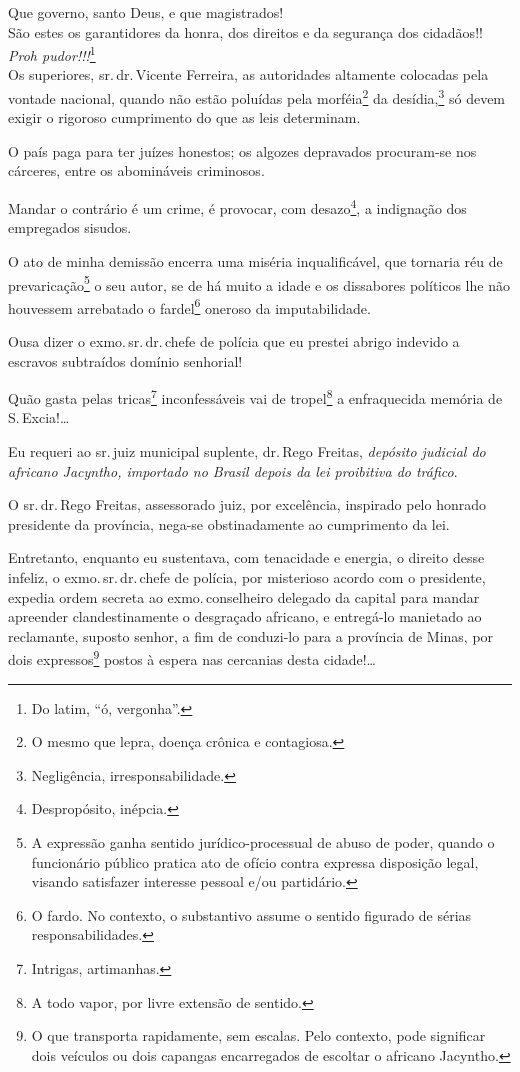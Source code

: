Que governo, santo Deus, e que magistrados!\\
São estes os garantidores da honra, dos direitos e da segurança dos
cidadãos!!\\
\emph{Proh pudor}\emph{!!!}\footnote{Do latim, ``ó, vergonha''.}\\
Os superiores, sr.\,dr.\,Vicente Ferreira, as autoridades altamente
colocadas pela vontade nacional, quando não estão poluídas pela
morféia\footnote{O mesmo que lepra, doença crônica e contagiosa.} da
desídia,\footnote{Negligência, irresponsabilidade.} só devem exigir o
rigoroso cumprimento do que as leis determinam.

O país paga para ter juízes honestos; os algozes depravados procuram-se
nos cárceres, entre os abomináveis criminosos.

Mandar o contrário é um crime, é provocar, com desazo\footnote{
  Despropósito, inépcia.}, a indignação dos empregados sisudos.

O ato de minha demissão encerra uma miséria inqualificável, que tornaria
réu de prevaricação\footnote{A expressão ganha sentido
  jurídico-processual de abuso de poder, quando o funcionário público
  pratica ato de ofício contra expressa disposição legal, visando
  satisfazer interesse pessoal e/ou partidário.} o seu autor, se de há
muito a idade e os dissabores políticos lhe não houvessem arrebatado o
fardel\footnote{O fardo. No contexto, o substantivo assume o sentido
  figurado de sérias responsabilidades.} oneroso da imputabilidade.

Ousa dizer o exmo.\,sr.\,dr.\,chefe de polícia que eu prestei abrigo
indevido a escravos subtraídos domínio senhorial!

Quão gasta pelas tricas\footnote{Intrigas, artimanhas.} inconfessáveis
vai de tropel\footnote{A todo vapor, por livre extensão de sentido.} a
enfraquecida memória de S.\,Excia!\ldots{}

Eu requeri ao sr.\,juiz municipal suplente, dr.\,Rego Freitas,
\emph{depósito judicial do africano Jacyntho, importado no Brasil depois
da lei proibitiva do tráfico}.

O sr.\,dr.\,Rego Freitas, assessorado juiz, por excelência, inspirado pelo
honrado presidente da província, nega-se obstinadamente ao cumprimento
da lei.

Entretanto, enquanto eu sustentava, com tenacidade e energia, o direito
desse infeliz, o exmo.\,sr.\,dr.\,chefe de polícia, por misterioso acordo
com o presidente, expedia ordem secreta ao exmo.\,conselheiro delegado da
capital para mandar apreender clandestinamente o desgraçado africano, e
entregá-lo manietado ao reclamante, suposto senhor, a fim de conduzi-lo
para a província de Minas, por dois expressos\footnote{O que
  transporta rapidamente, sem escalas. Pelo contexto, pode significar
  dois veículos ou dois capangas encarregados de escoltar o africano
  Jacyntho.} postos à espera nas cercanias desta cidade!\ldots{}

